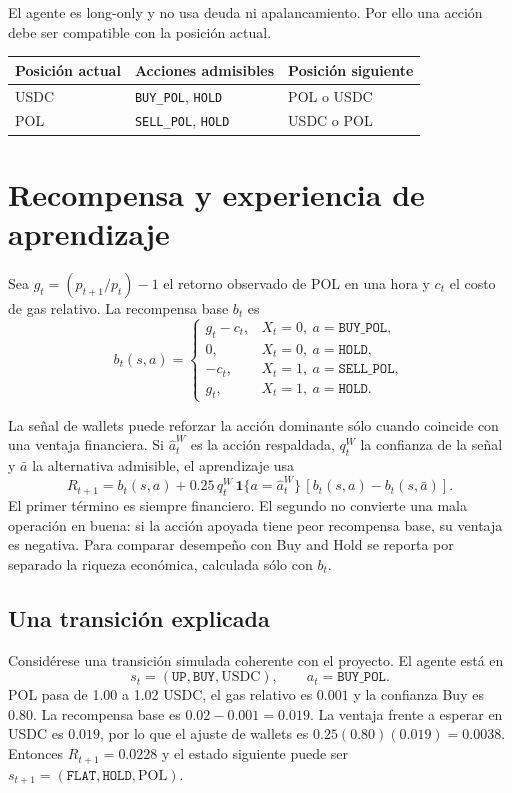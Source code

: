 \documentclass[12pt,letterpaper]{article}
\newcommand{\code}[1]{\texttt{#1}}
\begin{document}
El agente es long-only y no usa deuda ni apalancamiento. Por ello una acción
debe ser compatible con la posición actual.

\begin{center}
\begin{tabular}{lll}
\toprule
\textbf{Posición actual} & \textbf{Acciones admisibles} & \textbf{Posición siguiente}\\
\midrule
USDC & \code{BUY\_POL}, \code{HOLD} & POL o USDC\\
POL & \code{SELL\_POL}, \code{HOLD} & USDC o POL\\
\bottomrule
\end{tabular}
\end{center}

\section{Recompensa y experiencia de aprendizaje}

Sea $g_t=(p_{t+1}/p_t)-1$ el retorno observado de POL en una hora y $c_t$ el
costo de gas relativo. La recompensa base $b_t$ es
\[
b_t(s,a)=
\begin{cases}
g_t-c_t, & X_t=0,\ a=\code{BUY\_POL},\\
0, & X_t=0,\ a=\code{HOLD},\\
-c_t, & X_t=1,\ a=\code{SELL\_POL},\\
g_t, & X_t=1,\ a=\code{HOLD}.
\end{cases}
\]

La señal de wallets puede reforzar la acción dominante sólo cuando coincide con
una ventaja financiera. Si $\hat a_t^W$ es la acción respaldada, $q_t^W$ la
confianza de la señal y $\bar a$ la alternativa admisible, el aprendizaje usa
\[
R_{t+1}=b_t(s,a)+0.25\,q_t^W\,
\mathbf{1}\{a=\hat a_t^W\}\,[b_t(s,a)-b_t(s,\bar a)].
\]
El primer término es siempre financiero. El segundo no convierte una mala
operación en buena: si la acción apoyada tiene peor recompensa base, su ventaja
es negativa. Para comparar desempeño con Buy and Hold se reporta por separado
la riqueza económica, calculada sólo con $b_t$.

\subsection{Una transición explicada}

Considérese una transición simulada coherente con el proyecto. El agente está
en
\[
s_t=(\code{UP},\code{BUY},\text{USDC}),\qquad a_t=\code{BUY\_POL}.
\]
POL pasa de 1.00 a 1.02 USDC, el gas relativo es $0.001$ y la confianza Buy es
$0.80$. La recompensa base es $0.02-0.001=0.019$. La ventaja frente a esperar
en USDC es $0.019$, por lo que el ajuste de wallets es
$0.25(0.80)(0.019)=0.0038$. Entonces $R_{t+1}=0.0228$ y el estado siguiente
puede ser $s_{t+1}=(\code{FLAT},\code{HOLD},\text{POL})$.
\end{document}
